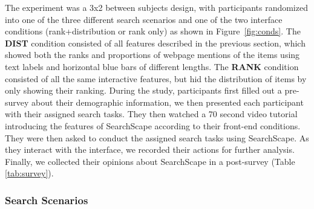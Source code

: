 The experiment was a 3x2 between subjects design, with participants randomized into one of the three different search scenarios and one of the two interface conditions (rank+distribution or rank only) as shown in Figure~\ref{fig:conds}. The \textbf{DIST} condition consisted of all features described in the previous section, which showed both the ranks and proportions of webpage mentions of the items using text labels and horizontal blue bars of different lengths. The \textbf{RANK} condition consisted of all the same interactive features, but hid the distribution of items by only showing their ranking. 
During the study, participants first filled out a pre-survey about their demographic information, we then presented each participant with their assigned search tasks.
They then watched a 70 second video tutorial introducing the features of SearchScape according to their front-end conditions. They were then asked to conduct the assigned search tasks using SearchScape. As they interact with the interface, we recorded their actions for further analysis. Finally, we collected their opinions about SearchScape in a post-survey (Table \ref{tab:survey}). 

\subsubsection{Search Scenarios}

